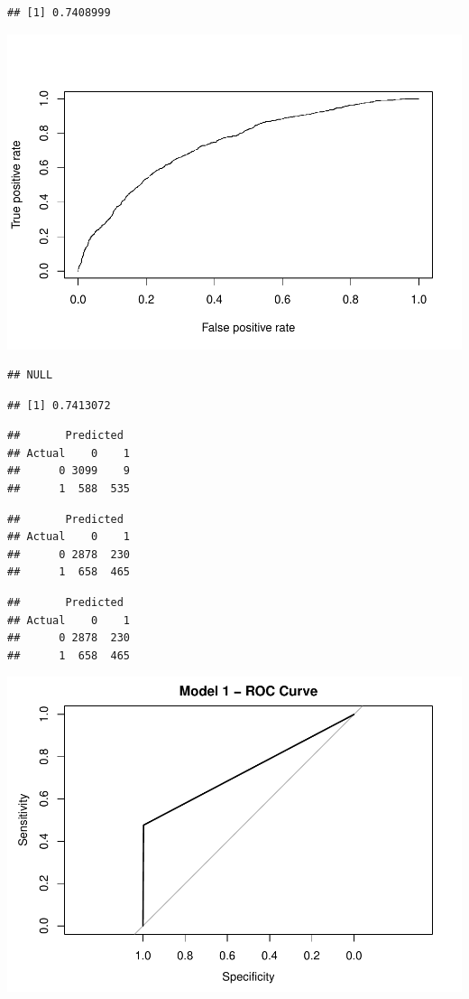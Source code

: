 \documentclass[]{article}
\begin{document}
\begin{verbatim}
## [1] 0.7408999
\end{verbatim}

\includegraphics{DATA621-Homework-4_files/figure-latex/unnamed-chunk-34-4.pdf}

\begin{verbatim}
## NULL
\end{verbatim}

\begin{verbatim}
## [1] 0.7413072
\end{verbatim}

\begin{verbatim}
##       Predicted
## Actual    0    1
##      0 3099    9
##      1  588  535
\end{verbatim}

\begin{verbatim}
##       Predicted
## Actual    0    1
##      0 2878  230
##      1  658  465
\end{verbatim}

\begin{verbatim}
##       Predicted
## Actual    0    1
##      0 2878  230
##      1  658  465
\end{verbatim}

\includegraphics{DATA621-Homework-4_files/figure-latex/unnamed-chunk-34-5.pdf}
\end{document}
